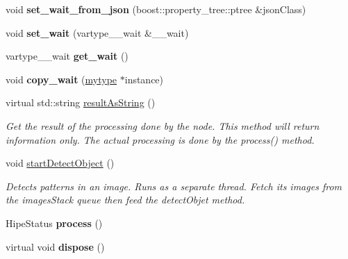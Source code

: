 \begin{DoxyCompactItemize}
\item 
\mbox{\label{classfilter_1_1algos_1_1_latch_a758e0bdfbf02ac1b69dfa204dfec0f37}} 
void {\bfseries set\+\_\+wait\+\_\+from\+\_\+json} (boost\+::property\+\_\+tree\+::ptree \&json\+Class)
\item 
\mbox{\label{classfilter_1_1algos_1_1_latch_a2411b2c64f5a11275715b4cc1a31a861}} 
void {\bfseries set\+\_\+wait} (vartype\+\_\+\+\_\+wait \&\+\_\+\+\_\+wait)
\item 
\mbox{\label{classfilter_1_1algos_1_1_latch_a8daaad6b46a4a33167ef8381ebf72d20}} 
vartype\+\_\+\+\_\+wait {\bfseries get\+\_\+wait} ()
\item 
\mbox{\label{classfilter_1_1algos_1_1_latch_a936d35f6936e0d777fe694ae1078ed68}} 
void {\bfseries copy\+\_\+wait} (\hyperlink{classfilter_1_1algos_1_1_latch}{mytype} $\ast$instance)
\item 
virtual std\+::string \hyperlink{classfilter_1_1algos_1_1_latch_a24c57b8d90c89b1f95fe2f7624a9d033}{result\+As\+String} ()
\begin{DoxyCompactList}\small\item\em Get the result of the processing done by the node. This method will return information only. The actual processing is done by the process() method. \end{DoxyCompactList}\item 
\mbox{\label{classfilter_1_1algos_1_1_latch_a3e9e6b5861679f3f43dd13b3bf7231b1}} 
void \hyperlink{classfilter_1_1algos_1_1_latch_a3e9e6b5861679f3f43dd13b3bf7231b1}{start\+Detect\+Object} ()
\begin{DoxyCompactList}\small\item\em Detects patterns in an image. Runs as a separate thread. Fetch its images from the images\+Stack queue then feed the detect\+Objet method. \end{DoxyCompactList}\item 
\mbox{\label{classfilter_1_1algos_1_1_latch_a49fec6087b073c4bae2eeee9eceb1a53}} 
Hipe\+Status {\bfseries process} ()
\item 
\mbox{\label{classfilter_1_1algos_1_1_latch_ac8c5bdd724e9ebdc57824a0053f63456}} 
virtual void {\bfseries dispose} ()
\end{DoxyCompactItemize}
